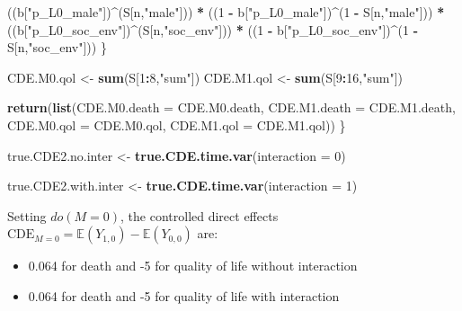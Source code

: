 \documentclass[
]{book}
\newenvironment{Shaded}{\begin{snugshade}}{\end{snugshade}}
\newcommand{\AttributeTok}[1]{\textcolor[rgb]{0.13,0.29,0.53}{#1}}
\newcommand{\DecValTok}[1]{\textcolor[rgb]{0.00,0.00,0.81}{#1}}
\newcommand{\FunctionTok}[1]{\textcolor[rgb]{0.13,0.29,0.53}{\textbf{#1}}}
\newcommand{\NormalTok}[1]{#1}
\newcommand{\OtherTok}[1]{\textcolor[rgb]{0.56,0.35,0.01}{#1}}
\newcommand{\SpecialCharTok}[1]{\textcolor[rgb]{0.81,0.36,0.00}{\textbf{#1}}}
\newcommand{\StringTok}[1]{\textcolor[rgb]{0.31,0.60,0.02}{#1}}
\providecommand{\tightlist}{%
  \setlength{\itemsep}{0pt}\setlength{\parskip}{0pt}}
\begin{document}
\begin{Shaded}
\begin{Highlighting}[]
\NormalTok{      ((b[}\StringTok{"p\_L0\_male"}\NormalTok{])}\SpecialCharTok{\^{}}\NormalTok{(S[n,}\StringTok{"male"}\NormalTok{])) }\SpecialCharTok{*} 
\NormalTok{      ((}\DecValTok{1} \SpecialCharTok{{-}}\NormalTok{ b[}\StringTok{"p\_L0\_male"}\NormalTok{])}\SpecialCharTok{\^{}}\NormalTok{(}\DecValTok{1} \SpecialCharTok{{-}}\NormalTok{ S[n,}\StringTok{"male"}\NormalTok{])) }\SpecialCharTok{*} 
\NormalTok{      ((b[}\StringTok{"p\_L0\_soc\_env"}\NormalTok{])}\SpecialCharTok{\^{}}\NormalTok{(S[n,}\StringTok{"soc\_env"}\NormalTok{])) }\SpecialCharTok{*}
\NormalTok{      ((}\DecValTok{1} \SpecialCharTok{{-}}\NormalTok{ b[}\StringTok{"p\_L0\_soc\_env"}\NormalTok{])}\SpecialCharTok{\^{}}\NormalTok{(}\DecValTok{1} \SpecialCharTok{{-}}\NormalTok{ S[n,}\StringTok{"soc\_env"}\NormalTok{])) }
\NormalTok{    \}}
  
\NormalTok{  CDE.M0.qol }\OtherTok{\textless{}{-}} \FunctionTok{sum}\NormalTok{(S[}\DecValTok{1}\SpecialCharTok{:}\DecValTok{8}\NormalTok{,}\StringTok{"sum"}\NormalTok{])}
\NormalTok{  CDE.M1.qol }\OtherTok{\textless{}{-}} \FunctionTok{sum}\NormalTok{(S[}\DecValTok{9}\SpecialCharTok{:}\DecValTok{16}\NormalTok{,}\StringTok{"sum"}\NormalTok{])}
  
  \FunctionTok{return}\NormalTok{(}\FunctionTok{list}\NormalTok{(}\AttributeTok{CDE.M0.death =}\NormalTok{ CDE.M0.death, }\AttributeTok{CDE.M1.death =}\NormalTok{ CDE.M1.death, }
              \AttributeTok{CDE.M0.qol =}\NormalTok{ CDE.M0.qol, }\AttributeTok{CDE.M1.qol =}\NormalTok{ CDE.M1.qol))}
\NormalTok{\}}
\end{Highlighting}
\end{Shaded}

\begin{Shaded}
\begin{Highlighting}[]
\NormalTok{true.CDE2.no.inter }\OtherTok{\textless{}{-}} \FunctionTok{true.CDE.time.var}\NormalTok{(}\AttributeTok{interaction =} \DecValTok{0}\NormalTok{)}

\NormalTok{true.CDE2.with.inter }\OtherTok{\textless{}{-}} \FunctionTok{true.CDE.time.var}\NormalTok{(}\AttributeTok{interaction =} \DecValTok{1}\NormalTok{)}
\end{Highlighting}
\end{Shaded}

Setting \(do(M=0)\), the controlled direct effects \(\text{CDE}_{M=0} = \mathbb{E}\left(Y_{1,0} \right) - \mathbb{E}\left(Y_{0,0} \right)\) are:

\begin{itemize}
\tightlist
\item
  0.064 for death and -5 for quality of life without interaction
\item
  0.064 for death and -5 for quality of life with interaction
\end{itemize}
\end{document}
